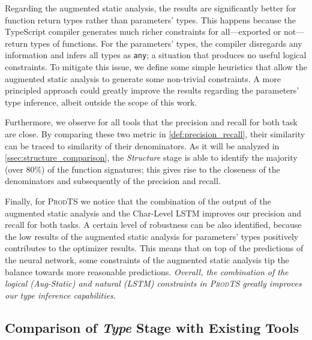 \documentclass[sigplan,10pt,anonymous]{acmart} %
\newcommand{\prodts}{\textsc{ProdTS}\xspace}
\theoremstyle{plain}
\theoremstyle{remark}
\theoremstyle{definition}
\begin{document}
Regarding the augmented static analysis, the results are significantly better for function return types rather than parameters' types.
This happens because the TypeScript compiler generates much richer constraints for all---exported or not---return types of functions.
For the parameters' types, the compiler disregards any information and infers all types as \texttt{any}; a situation that produces no useful logical constraints.
To mitigate this issue, we define some simple heuristics that allow the augmented static analysis to generate some non-trivial constraints.
A more principled approach could greatly improve the results regarding the parameters' type inference, albeit outside the scope of this work.

Furthermore, we observe for all tools that the precision and recall for both task are close.
By comparing these two metric in \cref{def:precision_recall}, their similarity can be traced to similarity of their denominators.
As it will be analyzed in \cref{ssec:structure_comparison}, the \textit{Structure} stage is able to identify the majority (over $80\%$) of the function signatures; this gives rise to the closeness of the denominators and subsequently of the precision and recall.

Finally, for \prodts we notice that the combination of the output of the augmented static analysis and the Char-Level LSTM improves our precision and recall for both tasks.
A certain level of robustness can be also identified, because the low results of the augmented static analysis for parameters' types positively contributes to the optimizer results.
This means that on top of the predictions of the neural network, some constraints of the augmented static analysis tip the balance towards more reasonable predictions.
\textit{Overall, the combination of the logical (Aug-Static) and natural (LSTM) constraints in \prodts greatly improves our type inference capabilities}.

\subsection{Comparison of \textit{Type} Stage with Existing Tools}
\end{document}
